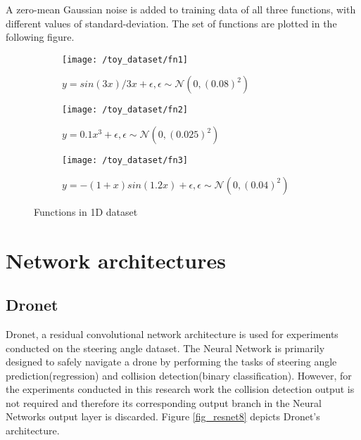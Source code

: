 A zero-mean Gaussian noise is added to training data of all three functions, with different values of standard-deviation. The set of functions are plotted in the following figure. 
\begin{figure}[H]
	\centering
	\begin{subfigure}[b]{0.45\textwidth}
		\centering
		\texttt{[image: /toy\_dataset/fn1]}
		\caption{$y=sin(3x)/3x+\epsilon, \epsilon \sim \mathcal{N}(0,(0.08)^2)$}
		\label{fig:y equals x}
	\end{subfigure}
	\hfill
	\begin{subfigure}[b]{0.45\textwidth}
		\centering
		\texttt{[image: /toy\_dataset/fn2]}
		\caption{$y=0.1x^3+\epsilon, \epsilon \sim \mathcal{N}(0,(0.025)^2)$}
		\label{fig:three sin x}
	\end{subfigure}
	\hfill
	\begin{subfigure}[b]{0.45\textwidth}
		\centering
		\texttt{[image: /toy\_dataset/fn3]}
		\caption{$y=-(1+x)sin(1.2x)+\epsilon, \epsilon \sim \mathcal{N}(0,(0.04)^2)$}
		\label{fig:five over x}
	\end{subfigure}
	\caption{Functions in 1D dataset}
	\label{fig_1d_dataset}
\end{figure}
   
\section{Network architectures}
\subsection{Dronet}
Dronet, a residual convolutional network architecture is used for experiments conducted on the steering angle dataset. The Neural Network is primarily designed to safely navigate a drone by performing the tasks of steering angle prediction(regression) and collision detection(binary classification). However, for the experiments conducted in this research work the collision detection output is not required and therefore its corresponding output branch in the Neural Networks output layer is discarded. Figure \ref{fig_resnet8} depicts Dronet's architecture.

